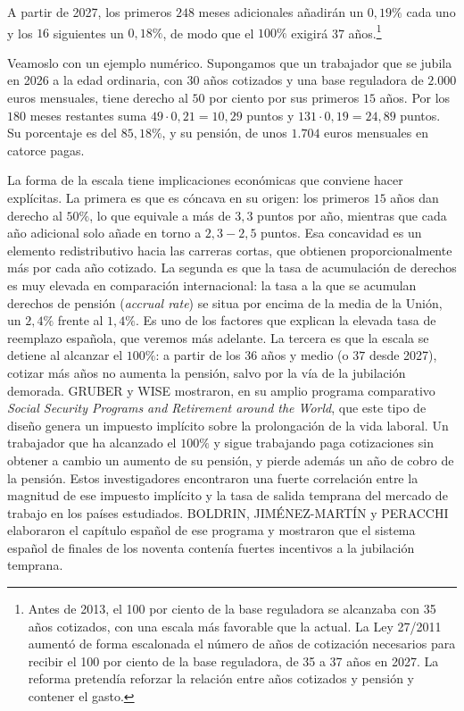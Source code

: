 \documentclass[10pt,a4paper]{article}
\begin{document}
A partir de 2027, los primeros $248$ meses adicionales añadirán un $0,19\%$ cada uno y los $16$ siguientes un $0,18\%$, de modo que el $100\%$ exigirá 37 años.\footnote{Antes de 2013, el 100 por ciento de la base reguladora se alcanzaba con 35 años cotizados, con una escala más favorable que la actual. La Ley 27/2011 aumentó de forma escalonada el número de años de cotización necesarios para recibir el 100 por ciento de la base reguladora, de 35 a 37 años en 2027. La reforma pretendía reforzar la relación entre años cotizados y pensión y contener el gasto.
}

Veamoslo con un ejemplo numérico. Supongamos que un trabajador que se jubila en 2026 a la edad ordinaria, con $30$ años cotizados y una base reguladora de $2.000$ euros mensuales, tiene derecho al $50$ por ciento por sus primeros $15$ años. Por los $180$ meses restantes suma $49 \cdot 0,21 = 10,29$ puntos y $131 \cdot 0,19 = 24,89$ puntos. Su porcentaje es del $85,18\%$, y su pensión, de unos $1.704$ euros mensuales en catorce pagas.

La forma de la escala tiene implicaciones económicas que conviene hacer explícitas. La primera es que es cóncava en su origen: los primeros $15$ años dan derecho al $50\%$, lo que equivale a más de $3,3$ puntos por año, mientras que cada año adicional solo añade en torno a $2,3-2,5$ puntos. Esa concavidad es un elemento redistributivo hacia las carreras cortas, que obtienen proporcionalmente más por cada año cotizado. La segunda es que la tasa de acumulación de derechos es muy elevada en comparación internacional: la tasa a la que se acumulan derechos de pensión (\textit{accrual rate}) se situa por encima de la media de la Unión, un $2,4\%$ frente al $1,4\%$. Es uno de los factores que explican la elevada tasa de reemplazo española, que veremos más adelante. La tercera es que la escala se detiene al alcanzar el $100\%$: a partir de los $36$ años y medio (o $37$ desde 2027), cotizar más años no aumenta la pensión, salvo por la vía de la jubilación demorada. GRUBER y WISE mostraron, en su amplio programa comparativo \textit{Social Security Programs and Retirement around the World}, que este tipo de diseño genera un impuesto implícito sobre la prolongación de la vida laboral. Un trabajador que ha alcanzado el $100\%$ y sigue trabajando paga cotizaciones sin obtener a cambio un aumento de su pensión, y pierde además un año de cobro de la pensión. Estos investigadores encontraron una fuerte correlación entre la magnitud de ese impuesto implícito y la tasa de salida temprana del mercado de trabajo en los países estudiados. BOLDRIN, JIMÉNEZ-MARTÍN y PERACCHI elaboraron el capítulo español de ese programa y mostraron que el sistema español de finales de los noventa contenía fuertes incentivos a la jubilación temprana.
\end{document}
